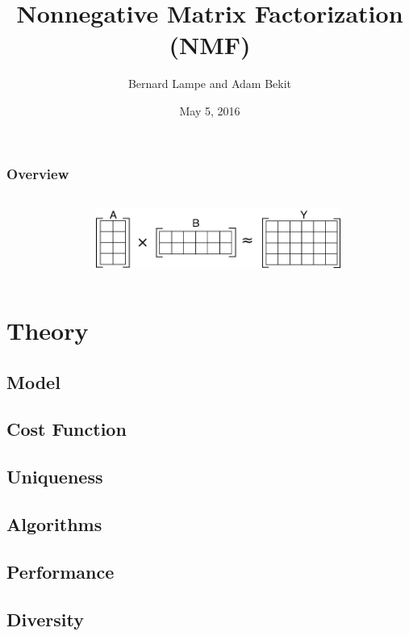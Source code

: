 \documentclass{beamer}
\title[NMF]{Nonnegative Matrix Factorization (NMF)}
\author{Bernard Lampe and Adam Bekit}
\date{May 5, 2016}
\begin{document}
\begin{frame}
\titlepage
\end{frame}

\begin{frame}
\frametitle{Overview}
\begin{columns}

\begin{column}{0.3\textwidth}
\tableofcontents
\end{column}

\begin{column}{0.7\textwidth}
\begin{figure}
  \includegraphics[width=8cm,center]{NMF}
\end{figure}
\end{column}
\end{columns}

\end{frame}

\section{Theory}
\subsection{Model}
\subsection{Cost Function}
\subsection{Uniqueness}
\subsection{Algorithms}
\subsection{Performance}
\subsection{Diversity}
\end{document}
